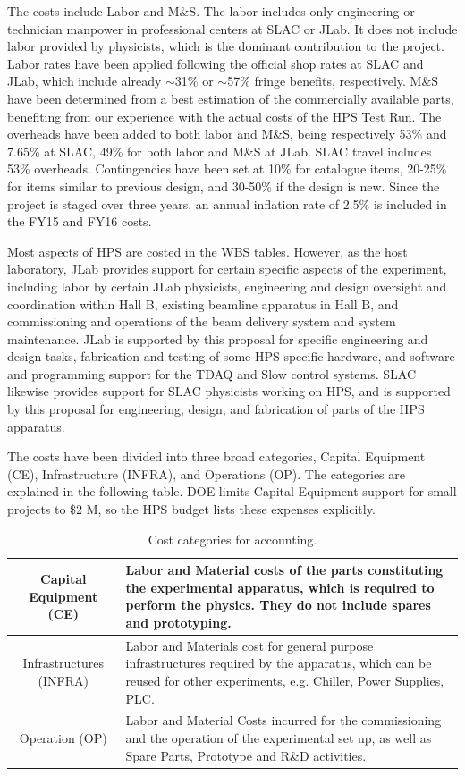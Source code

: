 The costs include Labor and M\&S. The labor includes only engineering or technician manpower in professional centers at SLAC or JLab. It does not 
include labor provided by physicists, which is the dominant contribution to the project. Labor rates have been applied following 
the official shop rates at SLAC and JLab, which include already $\sim$31\% or $\sim$57\% fringe benefits, respectively. M\&S have been determined from a best estimation 
of the commercially available parts,  benefiting from our experience with the actual costs of the HPS Test Run. The overheads have been added to both labor 
and M\&S, being respectively 53\% and 7.65\% at SLAC, 49\% for both labor and M\&S at JLab. SLAC travel includes 53\% overheads. 
Contingencies have been set at 10\% for catalogue items,  20-25\% for items similar to previous design, and 30-50\%  if the design is new.
Since the project is staged 
over three years, an annual inflation rate of 2.5\%  is included in the FY15 and FY16 costs.

Most aspects of HPS are costed in the WBS tables. However, as the host laboratory, JLab provides
support for certain specific aspects of the experiment, including labor by certain JLab physicists, engineering and design
oversight and coordination within Hall B, existing beamline apparatus in Hall B, and commissioning and operations of the beam
delivery system and system maintenance. JLab is supported by this proposal for specific engineering and design
tasks, fabrication and testing of some HPS specific hardware, and software and programming support for the TDAQ and Slow control
systems. SLAC likewise provides support for SLAC physicists working on HPS, and is supported by this proposal
for engineering, design, and fabrication of parts of the HPS apparatus.

The costs have been divided into three broad categories, Capital Equipment (CE), Infrastructure (INFRA), and Operations (OP). 
The categories are explained in the following table. DOE limits Capital Equipment support for small projects to \$2 M, so the HPS budget lists these
expenses explicitly.

\begin{table}[htdp]
\caption{Cost categories for accounting.}
\begin{center}
\begin{tabular}{|c|p{4 in}|}
\hline
Capital Equipment
(CE)
&
Labor and Material costs of the parts constituting the experimental apparatus,
which is required to perform the physics. They do not include spares and
prototyping.
\\
\hline
Infrastructures
(INFRA)
&
Labor and Materials cost for general purpose infrastructures required by the
apparatus, which can be reused for other experiments, e.g. Chiller, Power
Supplies, PLC.
\\
\hline
Operation (OP)
&
Labor and Material Costs incurred for the commissioning and the operation of the
experimental set up, as well as Spare Parts, Prototype and R\&D activities.
\\
\hline
\end{tabular}
\end{center}
\label{tb:costcats}
\end{table}


